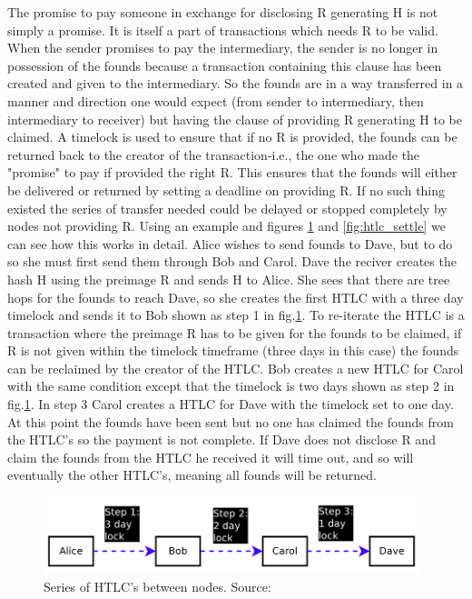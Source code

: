The promise to pay someone in exchange for disclosing R generating H is not simply a promise. It is itself a part of transactions which needs R to be valid. When the sender promises to pay the intermediary, the sender is no longer in possession of the founds because a transaction containing this clause has been created and given to the intermediary. So the founds are in a way transferred in a manner and direction one would expect (from sender to intermediary, then intermediary to receiver) but having the clause of providing R generating H to be claimed. A timelock is used to ensure that if no R is provided, the founds can be returned back to the creator of the transaction-i.e., the one who made the "promise" to pay if provided the right R. This ensures that the founds will either be delivered or returned by setting a deadline on providing R. If no such thing existed the series of transfer needed could be delayed or stopped completely by nodes not providing R.
Using an example and figures \ref{fig:htlc_promise} and \ref{fig:htlc_settle} we can see how this works in detail.
Alice wishes to send founds to Dave, but to do so she must first send them through Bob and Carol. Dave the reciver creates the hash H using the preimage R and sends H to Alice. She sees that there are tree hops for the founds to reach Dave, so she creates the first HTLC with a three day timelock and sends it to Bob shown as step 1 in fig.\ref{fig:htlc_promise}. To re-iterate the HTLC is a transaction where the preimage R has to be given for the founds to be claimed, if R is not given within the timelock timeframe (three days in this case) the founds can be reclaimed by the creator of the HTLC. Bob creates a new HTLC for Carol with the same condition except that the timelock is two days shown as step 2 in fig.\ref{fig:htlc_promise}. In step 3 Carol creates a HTLC for Dave with the timelock set to one day. At this point the founds have been sent but no one has claimed the founds from the HTLC's so the payment is not complete. If Dave does not disclose R and claim the founds from the HTLC he received it will time out, and so will eventually the other HTLC's, meaning all founds will be returned.

\begin{figure}[h]
    \centering
    \includegraphics[width=11cm]{figures/htlc_promise.png}
    \caption{Series of HTLC's between nodes. Source: \cite{poon2015bitcoin}}
    \label{fig:htlc_promise}
\end{figure}

